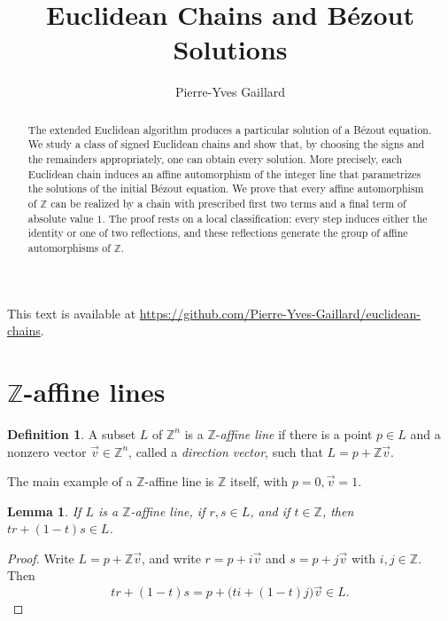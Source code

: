 \documentclass[12pt,letterpaper]{article}
\title{Euclidean Chains and Bézout Solutions}
\author{Pierre-Yves Gaillard}
\date{}
\numberwithin{equation}{section}
\newcommand{\Z}{\mathbb Z}
\theoremstyle{plain}
\newtheorem{lemma}[theorem]{Lemma}
\theoremstyle{definition}
\newtheorem{definition}[theorem]{Definition}
\begin{document}
\maketitle
\begin{center}
{\scriptsize This text is available at \url{https://github.com/Pierre-Yves-Gaillard/euclidean-chains}.}
\end{center}
\tableofcontents\bigskip

\begin{abstract}
The extended Euclidean algorithm produces a particular solution of a Bézout equation. We study a class of signed Euclidean chains and show that, by choosing the signs and the remainders appropriately, one can obtain every solution. More precisely, each Euclidean chain induces an affine automorphism of the integer line that parametrizes the solutions of the initial Bézout equation. We prove that every affine automorphism of $\Z$ can be realized by a chain with prescribed first two terms and a final term of absolute value $1$. The proof rests on a local classification: every step induces either the identity or one of two reflections, and these reflections generate the group of affine automorphisms of $\Z$. 
\end{abstract}

\section{\texorpdfstring{$\Z$-affine lines}{Z-affine lines}}

\begin{definition}\label{def:Z-affine-line}
A subset $L$ of $\Z^n$ is a $\Z$-\emph{affine line} if there is a point $p\in L$ and a nonzero vector $\vec{v}\in\Z^n$, called a \emph{direction vector}, such that $L=p+\Z\vec{v}$. 
\end{definition}

The main example of a $\Z$-affine line is $\Z$ itself, with $p=0,\vec v=1$. 

\begin{lemma}\label{lem:affine-line}
If $L$ is a $\Z$-affine line, if $r,s\in L$, and if $t\in\Z$, then $tr+(1-t)s\in L$. 
\end{lemma}

\begin{proof}
Write $L=p+\Z\vec v$, and write $r=p+i\vec v$ and $s=p+j\vec v$ with $i,j\in\Z$. Then
\[
 tr+(1-t)s=p+\bigl(ti+(1-t)j\bigr)\vec v\in L.
\]
\end{proof}
\end{document}
